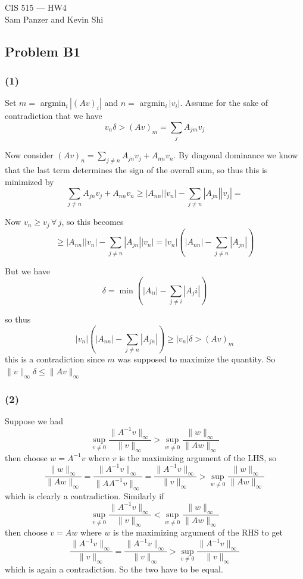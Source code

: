 \documentclass{article}
\begin{document}
\begin{center}CIS 515 --- HW4\\Sam Panzer and Kevin Shi\end{center}
\subsection{Problem B1}
\subsubsection{(1)}
Set $m=$ argmin$_i \, |(Av)_i|$ and $n=$ argmin$_i \, |v_i|$. Assume for the sake of contradiction that we have
 \[v_n \delta > (Av)_m = \displaystyle\sum_jA_{jm}v_j\]

Now consider $(Av)_n=\displaystyle\sum_{j\neq n}A_{jn}v_j+A_{nn}v_n$. By diagonal dominance we know that the last term determines the sign of the overall sum, so thus this is minimized by
\[\displaystyle\sum_{j\neq n}A_{jn}v_j+A_{nn}v_n \ge |A_{nn}||v_n| - \displaystyle\sum_{j\neq n} |A_{jn}||v_j| = \]

Now $v_n \ge v_j \, \forall \, j$, so this becomes
\[\ge |A_{nn}||v_n| - \displaystyle\sum_{j\neq n} |A_{jn}||v_n|=|v_n|\left(|A_{nn}|-\displaystyle\sum_{j\neq n}|A_{jn}|\right)\]

But we have 
\[\delta = \min \left(|A_{ii}|-\displaystyle\sum_{j\neq i}|A_ji|\right)\]

so thus
\[|v_n|\left(|A_{nn}|-\displaystyle\sum_{j\neq n}|A_{jn}|\right) \ge |v_n|\delta > (Av)_m\]
this is a contradiction since $m$ was supposed to maximize the quantity. So $\|v\|_{\infty}\delta \le \|Av\|_{\infty}$
\subsubsection{(2)}
Suppose we had
\[\displaystyle\sup_{v\neq 0}\dfrac{\|A^{-1}v\|_{\infty}}{\|v\|_{\infty}} > \displaystyle\sup_{w\neq 0}\dfrac{\|w\|_{\infty}}{\|Aw\|_{\infty}}\]
then choose $w=A^{-1}v$ where $v$ is the maximizing argument of the LHS, so 
\[\dfrac{\|w\|_\infty}{\|Aw\|_{\infty}}=\dfrac{\|A^{-1}v\|_{\infty}}{\|AA^{-1}v\|_{\infty}}=\dfrac{\|A^{-1}v\|_{\infty}}{\|v\|_{\infty}} > \displaystyle\sup_{w\neq 0}\dfrac{\|w\|_{\infty}}{\|Aw\|_{\infty}}\]
which is clearly a contradiction. Similarly if
\[\displaystyle\sup_{v\neq 0}\dfrac{\|A^{-1}v\|_{\infty}}{\|v\|_{\infty}} < \displaystyle\sup_{w\neq 0}\dfrac{\|w\|_{\infty}}{\|Aw\|_{\infty}}\]
then choose $v=Aw$ where $w$ is the maximizing argument of the RHS to get
\[\dfrac{\|A^{-1}v\|_{\infty}}{\|v\|_{\infty}} = \dfrac{\|A^{-1}v\|_{\infty}}{\|v\|_{\infty}} > \displaystyle\sup_{v\neq 0}\dfrac{\|A^{-1}v\|_{\infty}}{\|v\|_{\infty}}\]
which is again a contradiction. So the two have to be equal.
\end{document}
